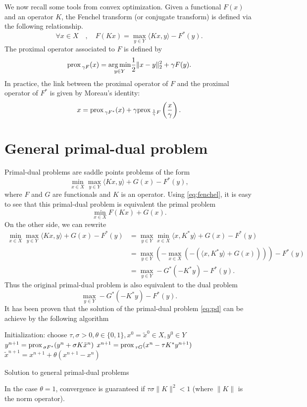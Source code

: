 \documentclass[letter,10pt]{article}
\def\prox{\textup{prox\,}}
\begin{document}
We now recall some tools from convex optimization. Given a functional $F(x)$ and an operator $K$, the Fenchel transform (or conjugate transform) is defined via the following relationship.
\begin{equation}\label{eq:fenchel}
\forall x\in X\quad,\quad F(Kx)=\max_{y\in Y}\langle Kx,y\rangle-F^*(y).
\end{equation}
The proximal operator associated to $F$ is defined by
$$\prox_{\gamma F}(x)=\underset{y\in Y}{\arg\min} \frac{1}{2}\|x-y\|_2^2+\gamma F(y).$$
In practice, the link between the proximal operator of $F$ and the proximal operator of $F^*$ is given by Moreau's identity:
$$x=\prox_{\gamma F^*}(x)+\gamma\prox_{\frac{1}{\gamma}F}\left(\frac{x}{\gamma}\right).$$

\section{General primal-dual problem}
Primal-dual problems are saddle points problems of the form
\begin{equation}\label{eq:pd}
\min_{x\in X}\max_{y\in Y}\langle Kx,y\rangle+G(x)-F^*(y),
\end{equation}
where $F$ and $G$ are functionals and $K$ is an operator. Using \eqref{eq:fenchel}, it is easy to see that this primal-dual problem is equivalent the primal problem
\begin{equation}\label{eq:primal}
\min_{x\in X} F(Kx)+G(x).
\end{equation}
On the other side, we can rewrite
\begin{align*}
\min_{x\in X}\max_{y\in Y}\langle Kx,y\rangle+G(x)-F^*(y)&=\max_{y\in Y}\min_{x\in X}\langle x,K^*y\rangle+G(x)-F^*(y)\\
&=\max_{y\in Y}\left(-\max_{x\in X}\left(-\left(\langle x,K^*y\rangle+G(x)\right)\right)\right)-F^*(y)\\
&=\max_{y\in Y} -G^*(-K^*y)-F^*(y).
\end{align*}
Thus the original primal-dual problem is also equivalent to the dual problem
$$\max_{y\in Y} -G^*(-K^*y)-F^*(y).$$
It has been proven that the solution of the primal-dual problem \eqref{eq:pd} can be achieve by the following algorithm
\begin{algorithm}[H]
\begin{algorithmic}
\STATE Initialization: choose $\tau,\sigma>0,\theta\in\{0,1\},x^0=\tilde{x}^0\in X,y^0\in Y$
\REPEAT 
\STATE $y^{n+1}=\prox_{\sigma F^*}(y^n+\sigma K\tilde{x}^n)$
\STATE $x^{n+1}=\prox_{\tau G}(x^n-\tau K^*y^{n+1})$
\STATE $\tilde{x}^{n+1}=x^{n+1}+\theta(x^{n+1}-x^n)$
\end{algorithmic}
\caption{Solution to general primal-dual problems}
\end{algorithm}
\noindent In the case $\theta=1$, convergence is guaranteed if $\tau\sigma\|K\|^2<1$ (where $\|K\|$ is the norm operator).
\end{document}
